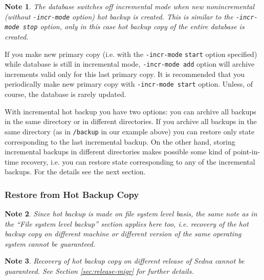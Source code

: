 \documentclass[a4paper,12pt]{article}
\newtheorem{note}{Note}    %
\begin{document}
\begin{note}
The database switches off incremental mode when new nonincremental (without
\verb!-incr-mode! option) hot backup is created. This is similar to the
\verb!-incr-mode stop! option, only in this case hot backup copy of the entire
database is created.
\end{note}

If you make new primary copy (i.e. with the \verb!-incr-mode! \verb!start!
option specified) while database is still in incremental mode, 
\verb!-incr-mode add! option will archive increments valid only for this last 
primary copy. It is recommended that you periodically make new primary copy with
\verb!-incr-mode start! option. Unless, of course, the database is rarely
updated.

With incremental hot backup you have two options: you can archive all backups in
the same directory or in different directories. If you archive all backups in
the same directory (as in \verb!/backup! in our example above) you can restore
only state corresponding to the last incremental backup. On the other hand,
storing incremental backups in different directories makes possible some kind of
point-in-time recovery, i.e. you can restore state corresponding to any of the
incremental backups. For the details see the next section.

\subsubsection*{Restore from Hot Backup Copy}

\begin{note}
Since hot backup is made on file system level basis, the same note as in the
``File system level backup'' section applies here too, i.e. recovery of the hot
backup copy on different machine or different version of the same operating
system cannot be guaranteed.
\end{note}

\begin{note}
Recovery of hot backup copy on different release of Sedna cannot be guaranteed.
See Section \ref{sec:release-migr} for further details.
\end{note}
\end{document}
